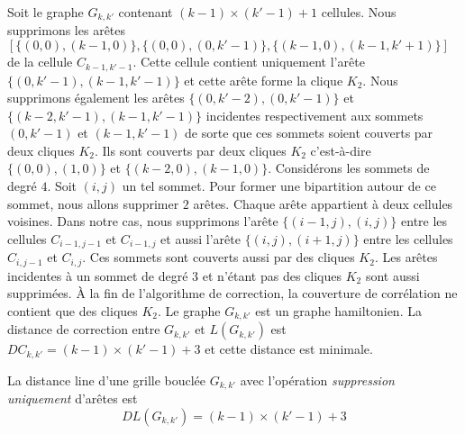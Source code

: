 \label{modificationSuppressionAretesUniquement}
Soit le graphe $G_{k,k'}$ contenant $(k-1) \times (k'-1) + 1$ cellules.
Nous supprimons les ar\^etes \\ $[\{(0,0),(k-1,0) \},  \{(0,0),(0, k'-1) \}, \{(k-1,0),(k-1,k'+1) \}]$ de la  cellule $C_{k-1,k'-1}$. Cette cellule contient uniquement  l'ar\^ete $\{(0,k'-1),(k-1,k'-1) \}$ et cette ar\^ete forme la clique $K_2$.
Nous supprimons \'egalement les ar\^etes $\{(0,k'-2),(0,k'-1)\}$ et $\{(k-2,k'-1),(k-1,k'-1) \}$  incidentes respectivement aux sommets $(0,k'-1)$ et $(k-1,k'-1)$ de sorte que ces sommets soient couverts par deux cliques $K_2$.
Ils sont couverts par deux cliques $K_2$ c'est-\`a-dire $\{(0,0),(1,0)\}$ et $\{(k-2,0) ,(k-1,0)\}$.
\newline
Consid\'erons les sommets de degr\'e $4$. Soit $(i,j)$ un tel sommet.
Pour former une bipartition autour de ce sommet, nous allons supprimer $2$ ar\^etes. Chaque ar\^ete appartient \`a deux cellules voisines. Dans notre cas, nous supprimons l'ar\^ete $\{(i-1, j), (i,j)\}$ entre les cellules $C_{i-1,j-1}$ et $C_{i-1,j}$ et aussi l'ar\^ete $\{(i,j), (i+1,j)\}$ entre les cellules $C_{i,j-1}$ et $C_{i,j}$. Ces sommets sont couverts aussi par des cliques $K_2$.
\newline
Les ar\^etes incidentes \`a un sommet de degr\'e $3$ et n'\'etant pas des cliques $K_2$ sont aussi supprim\'ees.
\newline
\`A la fin de l'algorithme de correction, la couverture de corr\'elation ne contient que des cliques $K_2$.
Le graphe $G_{k,k'}$ est un graphe hamiltonien.
La distance de correction entre $G_{k,k'}$ et $L(G_{k,k'})$ est 
$DC_{k,k'} = (k-1) \times (k'-1) +3 $ 
et cette distance est minimale.

\begin{lemma}
La distance line  d'une grille boucl\'ee $G_{k,k'}$ avec l'op\'eration {\em suppression uniquement} d'ar\^etes est 
\begin{equation}
\label{borneSuperieureDL}
DL(G_{k,k'}) = (k-1) \times (k'-1) +3 
\end{equation}
\end{lemma}

